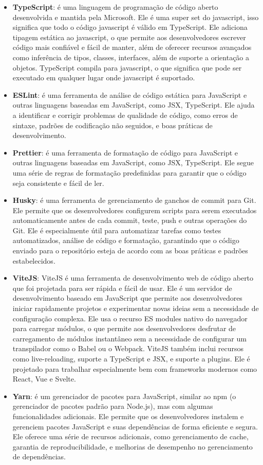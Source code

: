 \begin{itemize}
    \item \textbf{TypeScript}: é uma linguagem de programação de código aberto desenvolvida e mantida pela Microsoft. Ele é uma super set do javascript, isso significa que todo o código javascript é válido em TypeScript. Ele adiciona tipagem estática ao javascript, o que permite aos desenvolvedores escrever código mais confiável e fácil de manter, além de oferecer recursos avançados como inferência de tipos, classes, interfaces, além de suporte a orientação a objetos. TypeScript compila para javascript, o que significa que pode ser executado em qualquer lugar onde javascript é suportado.
    \item \textbf{ESLint}: é uma ferramenta de análise de código estática para JavaScript e outras linguagens baseadas em JavaScript, como JSX, TypeScript. Ele ajuda a identificar e corrigir problemas de qualidade de código, como erros de sintaxe, padrões de codificação não seguidos, e boas práticas de desenvolvimento.
    \item \textbf{Prettier}: é uma ferramenta de formatação de código para JavaScript e outras linguagens baseadas em JavaScript, como JSX, TypeScript. Ele segue uma série de regras de formatação predefinidas para garantir que o código seja consistente e fácil de ler.
    \item \textbf{Husky}: é uma ferramenta de gerenciamento de ganchos de commit para Git. Ele permite que os desenvolvedores configurem scripts para serem executados automaticamente antes de cada commit, teste, push e outras operações do Git. Ele é especialmente útil para automatizar tarefas como testes automatizados, análise de código e formatação, garantindo que o código enviado para o repositório esteja de acordo com as boas práticas e padrões estabelecidos.
    \item \textbf{ViteJS}: ViteJS é uma ferramenta de desenvolvimento web de código aberto que foi projetada para ser rápida e fácil de usar. Ele é um servidor de desenvolvimento baseado em JavaScript que permite aos desenvolvedores iniciar rapidamente projetos e experimentar novas ideias sem a necessidade de configuração complexa. Ele usa o recurso ES modules nativo do navegador para carregar módulos, o que permite aos desenvolvedores desfrutar de carregamento de módulos instantâneo sem a necessidade de configurar um transpilador como o Babel ou o Webpack. ViteJS também inclui recursos como live-reloading, suporte a TypeScript e JSX, e suporte a plugins. Ele é projetado para trabalhar especialmente bem com frameworks modernos como React, Vue e Svelte.
    \item \textbf{Yarn}: é um gerenciador de pacotes para JavaScript, similar ao npm (o gerenciador de pacotes padrão para Node.js), mas com algumas funcionalidades adicionais. Ele permite que os desenvolvedores instalem e gerenciem pacotes JavaScript e suas dependências de forma eficiente e segura. Ele oferece uma série de recursos adicionais, como gerenciamento de cache, garantia de reproducibilidade, e melhorias de desempenho no gerenciamento de dependências.
\end{itemize}

